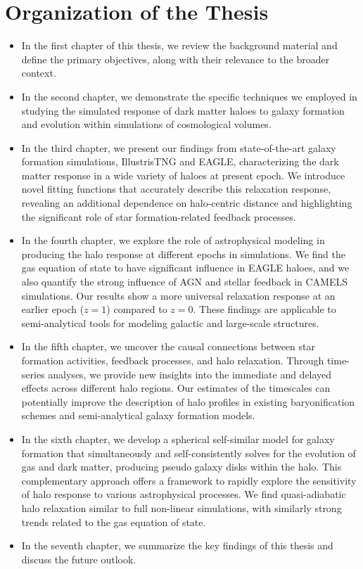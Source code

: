 \documentclass[a4paper, 12pt, oneside]{Thesis}  %
\begin{document}
\clearpage
\section*{Organization of the Thesis}

\begin{itemize}
    \item In the first chapter of this thesis, we review the background material and define the primary objectives, along with their relevance to the broader context.
    
    \item In the second chapter, we demonstrate the specific techniques we employed in studying the simulated response of dark matter haloes to galaxy formation and evolution within simulations of cosmological volumes.
    
    \item In the third chapter, we present our findings from state-of-the-art galaxy formation simulations, IllustrisTNG and EAGLE, characterizing the dark matter response in a wide variety of haloes at present epoch. We introduce novel fitting functions that accurately describe this relaxation response, revealing an additional dependence on halo-centric distance and highlighting the significant role of star formation-related feedback processes.
    
    \item In the fourth chapter, we explore the role of astrophysical modeling in producing the halo response at different epochs in simulations. We find the gas equation of state to have significant influence in EAGLE haloes, and we also quantify the strong influence of AGN and stellar feedback in CAMELS simulations. Our results show a more universal relaxation response at an earlier epoch ($z=1$) compared to $z=0$. These findings are applicable to semi-analytical tools for modeling galactic and large-scale structures.
    
    \item In the fifth chapter, we uncover the causal connections between star formation activities, feedback processes, and halo relaxation. Through time-series analyses, we provide new insights into the immediate and delayed effects across different halo regions. Our estimates of the timescales can potentially improve the description of halo profiles in existing baryonification schemes and semi-analytical galaxy formation models.

    \item In the sixth chapter, we develop a spherical self-similar model for galaxy formation that simultaneously and self-consistently solves for the evolution of gas and dark matter, producing pseudo galaxy disks within the halo. This complementary approach offers a framework to rapidly explore the sensitivity of halo response to various astrophysical processes. We find quasi-adiabatic halo relaxation similar to full non-linear simulations, with similarly strong trends related to the gas equation of state.

    \item In the seventh chapter, we summarize the key findings of this thesis and discuss the future outlook.
\end{itemize}
\end{document}
